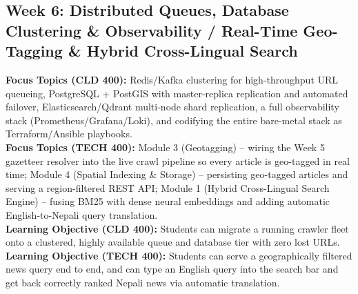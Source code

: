 \documentclass[10pt, a4paper]{article}
\begin{document}
\subsection*{Week 6: Distributed Queues, Database Clustering \& Observability / Real-Time Geo-Tagging \& Hybrid Cross-Lingual Search}
\textbf{Focus Topics (CLD 400):} Redis/Kafka clustering for high-throughput URL queueing, PostgreSQL + PostGIS with master-replica replication and automated failover, Elasticsearch/Qdrant multi-node shard replication, a full observability stack (Prometheus/Grafana/Loki), and codifying the entire bare-metal stack as Terraform/Ansible playbooks. \\[0.35em]
\textbf{Focus Topics (TECH 400):} Module 3 (Geotagging) -- wiring the Week 5 gazetteer resolver into the live crawl pipeline so every article is geo-tagged in real time; Module 4 (Spatial Indexing \& Storage) -- persisting geo-tagged articles and serving a region-filtered REST API; Module 1 (Hybrid Cross-Lingual Search Engine) -- fusing BM25 with dense neural embeddings and adding automatic English-to-Nepali query translation. \\[0.35em]
\textbf{Learning Objective (CLD 400):} Students can migrate a running crawler fleet onto a clustered, highly available queue and database tier with zero lost URLs. \\[0.35em]
\textbf{Learning Objective (TECH 400):} Students can serve a geographically filtered news query end to end, and can type an English query into the search bar and get back correctly ranked Nepali news via automatic translation.
\end{document}
